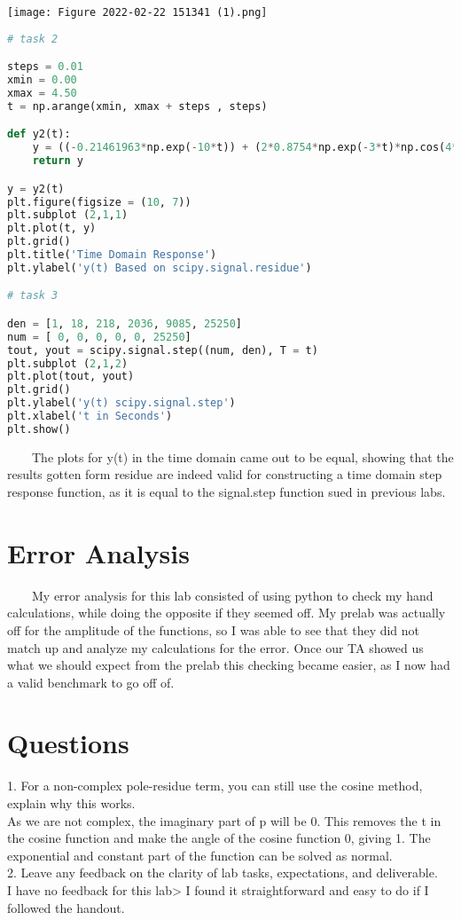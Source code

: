 \documentclass[11pt,a4]{article}
\begin{document}
\texttt{[image: Figure 2022-02-22 151341 (1).png]}

\begin{lstlisting}[language=Python]
# task 2

steps = 0.01
xmin = 0.00
xmax = 4.50
t = np.arange(xmin, xmax + steps , steps)

def y2(t):
    y = ((-0.21461963*np.exp(-10*t)) + (2*0.8754*np.exp(-3*t)*np.cos(4*t + math.radians(123.69))) + (2*0.1044*np.exp(-1*t)*np.cos(10*t + math.radians(-27.16))) + 1)*step(t)
    return y

y = y2(t)
plt.figure(figsize = (10, 7))
plt.subplot (2,1,1)
plt.plot(t, y)
plt.grid()
plt.title('Time Domain Response')
plt.ylabel('y(t) Based on scipy.signal.residue')

# task 3

den = [1, 18, 218, 2036, 9085, 25250]
num = [ 0, 0, 0, 0, 0, 25250]
tout, yout = scipy.signal.step((num, den), T = t)
plt.subplot (2,1,2)
plt.plot(tout, yout)
plt.grid()
plt.ylabel('y(t) scipy.signal.step')
plt.xlabel('t in Seconds')
plt.show()
\end{lstlisting}

\ \ \ \ The plots for y(t) in the time domain came out to be equal, showing that the results gotten form residue are indeed valid for constructing a time domain step response function, as it is equal to the signal.step function sued in previous labs.

\section{Error Analysis}
\ \ \ \ My error analysis for this lab consisted of using python to check my hand calculations, while doing the opposite if they seemed off. My prelab was actually off for the amplitude of the functions, so I was able to see that they did not match up and analyze my calculations for the error. Once our TA showed us what we should expect from the prelab this checking became easier, as I now had a valid benchmark to go off of.

\section{Questions}
1. For a non-complex pole-residue term, you can still use the cosine method, explain why this works.\\
As we are not complex, the imaginary part of p will be 0. This removes the t in the cosine function and make the angle of the cosine function 0, giving 1. The exponential and constant part of the function can be solved as normal.\\
2. Leave any feedback on the clarity of lab tasks, expectations, and deliverable.\\
I have no feedback for this lab> I found it straightforward and easy to do if I followed the handout.
\end{document}
